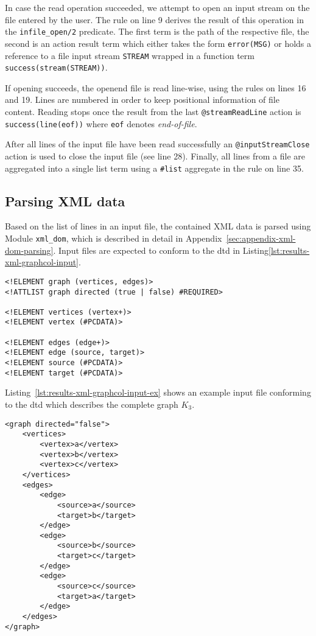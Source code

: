 In case the read operation succeeded, we attempt to open an input stream on the file entered by the user. The rule on line 9 derives the result of this operation in the \texttt{infile\_open/2} predicate. The first term is the path of the respective file, the second is an action result term which either takes the form \texttt{error(MSG)} or holds a reference to a file input stream \texttt{STREAM} wrapped in a function term \texttt{success(stream(STREAM))}.

If opening succeeds, the openend file is read line-wise, using the rules on lines 16 and 19. Lines are numbered in order to keep positional information of file content. Reading stops once the result from the last \texttt{@streamReadLine} action is \texttt{success(line(eof))} where \texttt{eof} denotes \emph{end-of-file}.

After all lines of the input file have been read successfully an \texttt{@inputStreamClose} action is used to close the input file (see line 28). Finally, all lines from a file are aggregated into a single list term using a \texttt{\#list} aggregate in the rule on line 35.

\subsection{Parsing XML data}
\label{subsec:results-xml-parsing}

Based on the list of lines in an input file, the contained XML data is parsed using Module \texttt{xml\_dom}, which is described in detail in Appendix~\ref{sec:appendix-xml-dom-parsing}. Input files are expected to conform to the \gls{dtd} in Listing\ref{lst:results-xml-graphcol-input}.

\begin{lstlisting}[style=asp-code, label={lst:results-xml-graphcol-input}, caption={\gls{dtd} for graph XML files.}]  
<!ELEMENT graph (vertices, edges)>
<!ATTLIST graph directed (true | false) #REQUIRED>

<!ELEMENT vertices (vertex+)>
<!ELEMENT vertex (#PCDATA)>

<!ELEMENT edges (edge+)>
<!ELEMENT edge (source, target)>
<!ELEMENT source (#PCDATA)>
<!ELEMENT target (#PCDATA)>    
\end{lstlisting}    

Listing~\ref{lst:results-xml-graphcol-input-ex} shows an example input file conforming to the \gls{dtd} which describes the complete graph $K_3$.

\begin{lstlisting}[style=asp-code, label={lst:results-xml-graphcol-input-ex}, caption={The complete graph $K_3$ represented according to the \gls{dtd} from Listing~\ref{lst:results-xml-graphcol-input}.}]
<graph directed="false">
    <vertices>
        <vertex>a</vertex>
        <vertex>b</vertex>
        <vertex>c</vertex>
    </vertices>
    <edges>
        <edge>
            <source>a</source>
            <target>b</target>
        </edge>
        <edge>
            <source>b</source>
            <target>c</target>
        </edge>
        <edge>
            <source>c</source>
            <target>a</target>
        </edge>
    </edges>    
</graph>
\end{lstlisting} 

